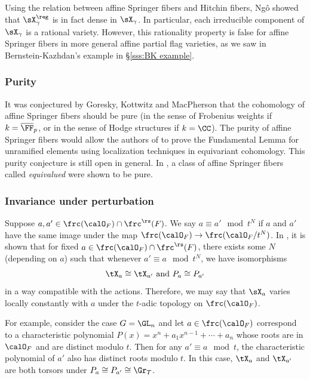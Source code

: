 \begin{remark} Using the relation between affine Springer fibers and Hitchin fibers, Ng\^o \cite[Cor 4.16.2]{NgoFL} showed that $\sX^{\reg}_{\gamma}$ is in fact dense in $\sX_{\gamma}$. In particular, each irreducible component of $\sX_{\gamma}$ is a rational variety. However, this rationality property is false for affine Springer fibers in more general affine partial flag varieties, as we saw in Bernstein-Kazhdan's example in \S\ref{sss:BK example}. 
\end{remark}


\subsubsection{Purity} It was conjectured by Goresky, Kottwitz and MacPherson \cite{GKM} that the cohomology of affine Springer fibers should be pure (in the sense of Frobenius weights if $k=\overline{\FF}_{p}$, or in the sense of Hodge structures if $k=\CC$). The purity of affine Springer fibers would allow the authors of \cite{GKM} to prove the Fundamental Lemma for unramified elements using localization techniques in equivariant cohomology. This purity conjecture is still open in general. In \cite{GKMPurity}, a class of affine Springer fibers called {\em equivalued} were shown to be pure.


\subsubsection{Invariance under perturbation}  Suppose $a,a'\in\frc(\calO_{F})\cap\frc^{\rs}(F)$. We say $a\equiv a'\mod t^{N}$ if $a$ and $a'$ have the same image under the map $\frc(\calO_{F})\to\frc(\calO_{F}/t^{N})$. In \cite[Prop 3.5.1]{NgoFL}, it is shown that for fixed $a\in\frc(\calO_{F})\cap\frc^{\rs}(F)$, there exists some $N$ (depending on $a$) such that whenever $a'\equiv a\mod t^{N}$, we have isomorphisms
\begin{equation*}
\tX_{a}\cong\tX_{a'} \textup{ and } P_{a}\cong P_{a'}
\end{equation*}
in a way compatible with the actions. Therefore, we may say that $\sX_{a}$ varies locally constantly with $a$ under the $t$-adic topology on $\frc(\calO_{F})$. 

For example,  consider the case $G=\GL_{n}$ and let $a\in\frc(\calO_{F})$ correspond to a characteristic polynomial $P(x)=x^{n}+a_{1}x^{n-1}+\cdots+a_{n}$ whose roots are in $\calO_{F}$ and are distinct modulo $t$. Then for any $a'\equiv a\mod t$, the characteristic polynomial of $a'$ also has distinct roots modulo $t$. In this case, $\tX_{a}$ and $\tX_{a'}$ are both torsors under $P_{a}\cong P_{a'}\cong \Gr_{T}$.




